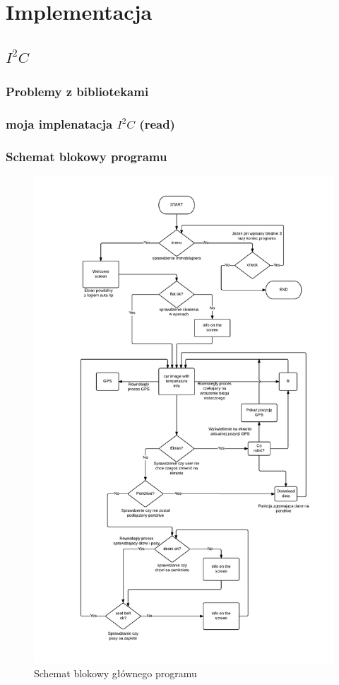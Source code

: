 \documentclass{xmgr}
\begin{document}
\chapter{Implementacja}
\section{$I^2C$}
\subsection{Problemy z bibliotekami}
\subsection{moja implenatacja $I^2C$ (read)}
\subsection{Schemat blokowy programu}

\begin{figure}[!htb]
    \centering
    \includegraphics[height=0.4\textheight]{images/schemat_blokowy.png}
    \caption{Schemat blokowy głównego programu\label{SchematBlokowy}}
\end{figure}
\end{document}
